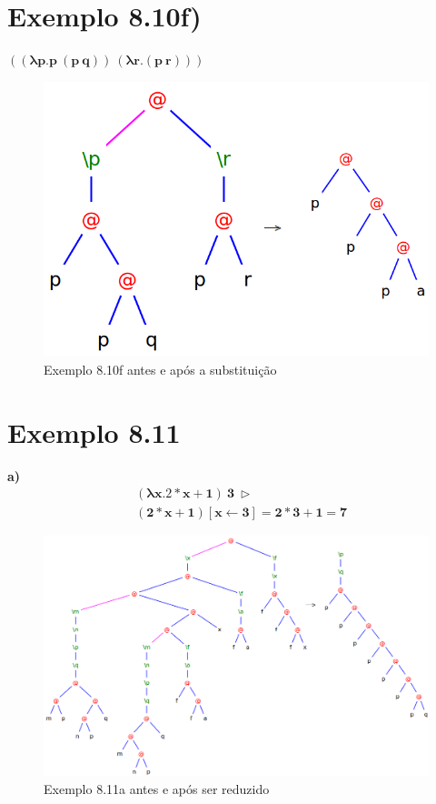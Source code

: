 \documentclass[a4paper]{article}
\begin{document}
\FloatBarrier

\section*{Exemplo 8.10f)}

$\mathbf{((\lambda p.p\ (p\ q))\ (\lambda r.(p\ r)))}$

\begin{figure}[h]
  \centering
  \includegraphics[scale=0.5]{8-10f.png}
  \caption{Exemplo 8.10f antes e após a substituição}
\end{figure}

\FloatBarrier

\section*{Exemplo 8.11}
\textbf{a)}
\begin{align*}
&\mathbf{(\lambda x.2 * x + 1)\ 3\ \rhd} \\
&\mathbf{(2 * x + 1) [x \leftarrow 3] = 2*3 + 1 = 7}
\end{align*}

\begin{figure}[h]
  \centering
  \includegraphics[scale=0.5]{8-11a_1.png}
  \caption{Exemplo 8.11a antes e após ser reduzido}
\end{figure}
\end{document}
